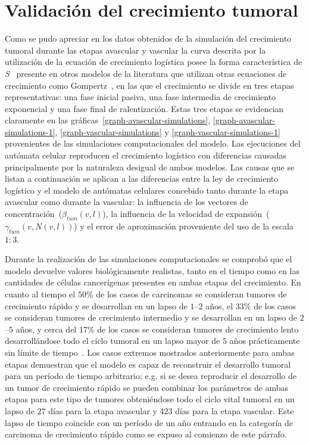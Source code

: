\section{Validaci\'on del crecimiento tumoral}
\label{sec-growth-validation}
Como se pudo apreciar en los datos obtenidos de la simulaci\'on del crecimiento tumoral durante las etapas avascular y vascular la curva descrita por la utilizaci\'on de la ecuaci\'on de crecimiento log\'istica posee la forma caracter\'istica de \emph{S}~\cite{book} presente en otros modelos de la literatura que utilizan otras ecuaciones de crecimiento como Gompertz~\cite{kansal,dormann,kansal2,kansal3}, en las que el crecimiento se divide en tres etapas representativas: una fase inicial pasiva, una fase intermedia de crecimiento exponencial y una fase final de ralentizaci\'on. Estas tres etapas se evidencian claramente en las gr\'aficas~\ref{graph-avascular-simulations}, \ref{graph-avascular-simulations-1}, \ref{graph-vascular-simulations} y \ref{graph-vascular-simulations-1} provenientes de las simulaciones computacionales del modelo. Las ejecuciones del aut\'omata celular reproducen el crecimiento log\'istico con diferencias causadas principalmente por la naturaleza desigual de ambos modelos. Las causas que se listan a continuaci\'on se aplican a las diferencias entre la ley de crecimiento log\'istico y el modelo de aut\'omatas celulares concebido tanto durante la etapa avascular como durante la vascular: la influencia de los vectores de concentraci\'on~($\beta_{tum}(v,l)$), la influencia de la velocidad de expansi\'on~($\gamma_{tum}(v,N(v,l))$) y el error de aproximaci\'on proveniente del uso de la escala $1:3$.

Durante la realizaci\'on de las simulaciones computacionales se comprob\'o que el modelo devuelve valores biol\'ogicamente realistas, tanto en el tiempo como en las cantidades de c\'elulas cancer\'igenas presentes en ambas etapas del crecimiento. En cuanto al tiempo el $50\%$ de los casos de carcinomas se consideran tumores de crecimiento r\'apido y se desarrollan en un lapso de $1$--$2$ a\~nos, el $33\%$ de los casos se consideran tumores de crecimiento intermedio y se desarrollan en un lapso de $2$--$5$ a\~nos, y cerca del $17\%$ de los casos se consideran tumores de crecimiento lento desarroll\'andose todo el ciclo tumoral en un lapso mayor de $5$ a\~nos pr\'acticamente sin l\'imite de tiempo~\cite{nakashima,leekim,sopik}. Los casos extremos mostrados anteriormente para ambas etapas demuestran que el modelo es capaz de reconstruir el desarrollo tumoral para un per\'iodo de tiempo arbitrario; e.g. si se desea reproducir el desarrollo de un tumor de crecimiento r\'apido se pueden combinar los par\'ametros de ambas etapas para este tipo de tumores obteni\'endose todo el ciclo vital tumoral en un lapso de $27$ d\'ias para la etapa avascular y $423$ d\'ias para la etapa vascular. Este lapso de tiempo coincide con un per\'iodo de un a\~no entrando en la categor\'ia de carcinoma de crecimiento r\'apido como se expuso al comienzo de este p\'arrafo.

